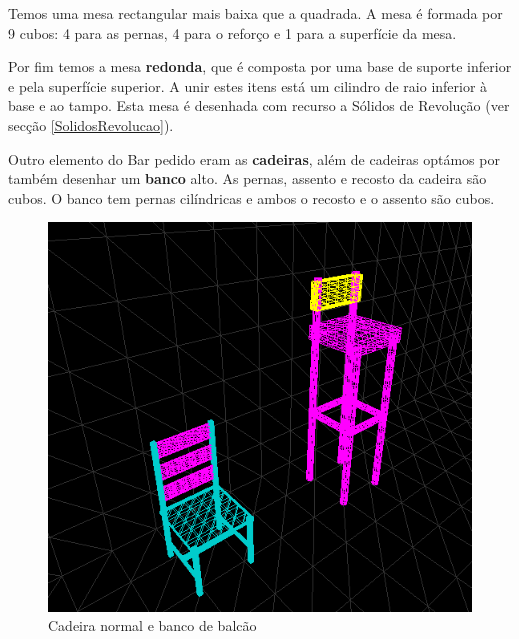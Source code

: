 \documentclass[a5paper,onecolumn, 11pt]{article}
\begin{document}
\begin{description}
Temos uma mesa rectangular mais baixa que a quadrada. A mesa é formada por 9 cubos: 4 para as pernas, 4 para o reforço e 1 para a superfície da mesa.

Por fim temos a mesa \textbf{redonda}, que é composta por uma base de suporte inferior e pela superfície superior. A unir estes itens está um cilindro de raio inferior à base e ao tampo. Esta mesa é desenhada com recurso a Sólidos de Revolução (ver secção \ref{SolidosRevolucao}).

Outro elemento do Bar pedido eram as \textbf{cadeiras}, além de cadeiras optámos por também desenhar um \textbf{banco} alto. As pernas, assento e recosto da cadeira são cubos. O banco tem pernas cilíndricas e ambos o recosto e o assento são cubos.
\begin{figure}[h!b!t!]
    \centering
    \includegraphics[scale=0.7]{cadeiras.png}
    \caption{Cadeira normal e banco de balcão}
\end{figure}


\end{description}
\end{document}
